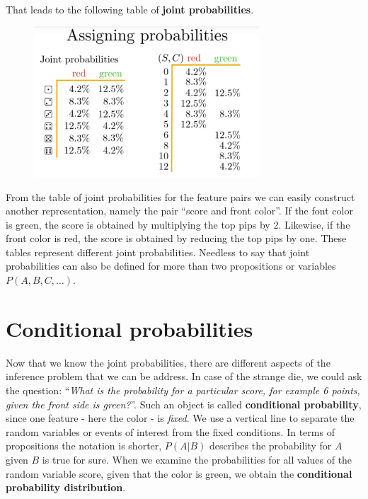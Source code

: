 \documentclass[12pt, a4paper]{scrartcl}
\begin{document}
\\

That leads to the following table of \textbf{joint probabilities}. %
\begin{figure}[H]
	\centering
	\includegraphics[width=0.75\textwidth]{3_5.png}
\end{figure}
From the table of joint probabilities for the feature pairs we can easily construct another representation, namely the pair ``score and front color''.
If the font color is green, the score is obtained by multiplying the top pips by 2.
Likewise, if the front color is red, the score is obtained by reducing the top pips by one.
These tables represent different joint probabilities. 
Needless to say that joint probabilities can also be defined for more than two propositions or variables $P(A,B,C,\ldots)$.\\

\section*{Conditional probabilities}
Now that we know the joint probabilities, there are different aspects of the inference problem that we can be address.
In case of the strange die, we could ask the question:  
``\textit{What is the probability for a particular score, for example 6 points, given the front side is green?}''.
Such an object is called \textbf{conditional probability}, since one feature - here the color - is \textit{fixed}. 
We use a vertical line to separate the random variables or events of interest from the fixed conditions. In terms of propositions the notation is shorter, $P(A|B)$ describes the probability for $A$ given $B$ is true for sure.
When we examine the probabilities for all values of the random variable score, given that the color is green, we obtain the \textbf{conditional probability distribution}.\\
\end{document}
